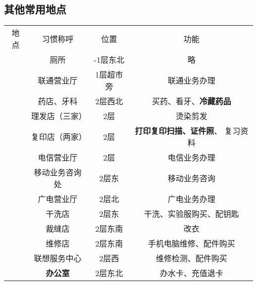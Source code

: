 \subsection[其他常用地点]{其他常用地点}
\label{common_locations}
\begin{table}[H]
    \centering
    \begin{tabular}{|c|c|c|c|}
        \Xhline{1.2pt}
        地点                    & 习惯称呼          & 位置         & 功能                           \\
        \Xhline{1.2pt}
        \multirow{16}{*}{大服}  & 厕所            & -1层东北      & 略                            \\
        \cline{2-4}
                              & 联通营业厅         & 1层超市旁      & 联通业务办理                       \\
        \cline{2-4}
                              & 药店、牙科         & 2层西北       & 买药、看牙、\textbf{冷藏药品}          \\
        \cline{2-4}
                              & 理发店（三家）       & 2层         & 烫染剪发                         \\
        \cline{2-4}
                              & 复印店（两家）       & 2层         & \textbf{打印复印扫描、证件照}、 复习资料    \\
        \cline{2-4}
                              & 电信营业厅         & 2层         & 电信业务办理                       \\
        \cline{2-4}
                              & 移动业务咨询处       & 2层东        & 移动业务咨询                       \\
        \cline{2-4}
                              & 广电营业厅         & 2层北        & 广电业务办理                       \\
        \cline{2-4}
                              & 干洗店           & 2层东        & 干洗、实验服购买、配钥匙                 \\
        \cline{2-4}
                              & 裁缝店           & 2层东南       & 改衣                           \\
        \cline{2-4}
                              & 维修店           & 2层东南       & 手机电脑维修、配件购买                  \\
        \cline{2-4}
                              & 联想服务中心        & 2层西        & 维修检测、配件购买                    \\
        \cline{2-4}
                              & \textbf{办公室}  & 2层东北       & 办水卡、充值退卡                     \\

\end{tabular}
\end{table}
